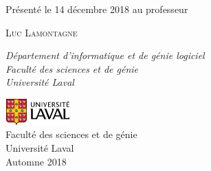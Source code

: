 \begin{titlepage}
	\vspace*{3\baselineskip} %
	
	
	Présenté le 14 décembre 2018 au professeur
	
	\vspace{0.5\baselineskip} %
	
	{\scshape\Large Luc Lamontagne \\} %
	
	\vspace{0.5\baselineskip} %
	
	\textit{Département d'informatique et de génie logiciel\\Faculté des sciences et de génie\\Université Laval} %
	
	\vfill %
	
	
        
        \includegraphics[height=1cm, width=2.5cm]{UL_P.pdf}\\
        Faculté des sciences et de génie\\
        Université Laval\\
        Automne 2018       
\end{titlepage}
